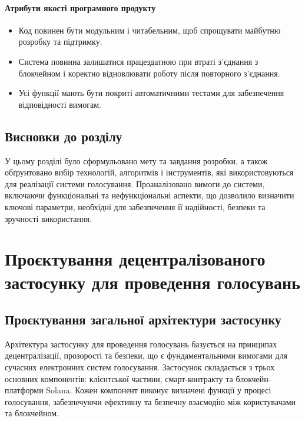 \documentclass[14pt]{extreport}
\begin{document}
  \subsubsection{Атрибути якості програмного продукту}
  \begin{itemize}  
    \item Код повинен бути модульним і читабельним, щоб спрощувати майбутню розробку та підтримку.  
    \item Система повинна залишатися працездатною при втраті з'єднання з блокчейном і коректно відновлювати роботу після повторного з'єднання.
    \item Усі функції мають бути покриті автоматичними тестами для забезпечення відповідності вимогам.  
  \end{itemize}

 
  \section{Висновки до розділу}
  
  У цьому розділі було сформульовано мету та завдання розробки, а також обґрунтовано вибір технологій, алгоритмів і інструментів, які використовуються для реалізації системи голосування. Проаналізовано вимоги до системи, включаючи функціональні та нефункціональні аспекти, що дозволило визначити ключові параметри, необхідні для забезпечення її надійності, безпеки та зручності використання.

  \chapter{Проєктування децентралізованого застосунку для проведення голосувань}

  \section{Проєктування загальної архітектури застосунку}
  
  Архітектура застосунку для проведення голосувань базується на принципах децентралізації, прозорості та безпеки, що є фундаментальними вимогами для сучасних електронних систем голосування. Застосунок складається з трьох основних компонентів: клієнтської частини, смарт-контракту та блокчейн-платформи Solana. Кожен компонент виконує визначені функції у процесі голосування, забезпечуючи ефективну та безпечну взаємодію між користувачами та блокчейном.
\end{document}
